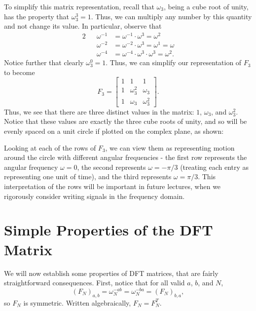 \documentclass[letterpaper]{article}
\theoremstyle{remark}
\newcommand{\mat}[1]{\ensuremath{\begin{bmatrix}#1\end{bmatrix}}}
\newcommand{\eqn}[1]{\begin{alignat*}{2}#1\end{alignat*}}
\begin{document}
To simplify this matrix representation, recall that $\omega_3$, being a cube root of unity, has the property that $\omega_3^3 = 1$. Thus, we can multiply any number by this quantity and not change its value. In particular, observe that
\eqn{
    && \omega^{-1} &= \omega^{-1} \cdot \omega^3 = \omega^2 \\
    && \omega^{-2} &= \omega^{-2} \cdot \omega^3 = \omega^1 = \omega \\
    && \omega^{-4} &= \omega^{-4} \cdot \omega^3 \cdot \omega^3 = \omega^2.
}
Notice further that clearly $\omega_3^0 = 1$. Thus, we can simplify our representation of $F_3$ to become
\[
    F_3 = \mat{
    1 & 1 & 1 \\
    1 & \omega_3^{2} & \omega_3 \\
    1 & \omega_3 & \omega_3^{2}}.
\]
Thus, we see that there are three distinct values in the matrix: $1$, $\omega_3$, and $\omega_3^2$. Notice that these values are exactly the three cube roots of unity, and so will be evenly spaced on a unit circle if plotted on the complex plane, as shown:
\begin{center}
\end{center}

Looking at each of the rows of $F_3$, we can view them as representing motion around the circle with different angular frequencies - the first row represents the angular frequency $\omega = 0$, the second represents $\omega = -\pi / 3$ (treating each entry as representing one unit of time), and the third represents $\omega = \pi / 3$. This interpretation of the rows will be important in future lectures, when we rigorously consider writing signals in the frequency domain.

\section{Simple Properties of the DFT Matrix}
We will now establish some properties of DFT matrices, that are fairly straightforward consequences. First, notice that for all valid $a$, $b$, and $N$,
\[
    (F_N)_{a, b} = \omega_N^{-ab} = \omega_N^{-ba} = (F_N)_{b, a},
\]
so $F_N$ is symmetric. Written algebraically, $F_N = F_N^T$.
\end{document}
